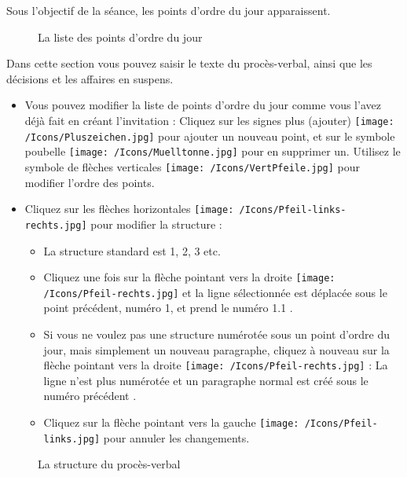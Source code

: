 Sous l'objectif de la séance, les points d'ordre du jour apparaissent.

\begin{figure}[H]
\caption{La liste des points d'ordre du jour}
\end{figure}

Dans cette section vous pouvez saisir le texte du procès-verbal, ainsi que les décisions et les affaires en suspens.

\begin{itemize}
\item
Vous pouvez modifier la liste de points d'ordre du jour comme vous l'avez déjà fait en créant l'invitation : Cliquez sur les signes plus (ajouter) \texttt{[image: /Icons/Pluszeichen.jpg]}  pour ajouter un nouveau point, et sur le symbole poubelle \texttt{[image: /Icons/Muelltonne.jpg]}  pour en supprimer un. Utilisez le symbole de flèches verticales \texttt{[image: /Icons/VertPfeile.jpg]}  pour modifier l'ordre des points.
\item
Cliquez sur les flèches horizontales \texttt{[image: /Icons/Pfeil-links-rechts.jpg]}  pour modifier la structure :

	\begin{itemize}
		\item
		La structure standard est 1, 2, 3 etc. 
		\item
		Cliquez une fois sur la flèche pointant vers la droite \texttt{[image: /Icons/Pfeil-rechts.jpg]}  et la ligne sélectionnée est déplacée sous le point précédent, numéro 1, et prend le numéro 1.1 .
		\item
		Si vous ne voulez pas une structure numérotée sous un point d'ordre du jour, mais simplement un nouveau paragraphe, cliquez à nouveau sur la flèche pointant vers la droite \texttt{[image: /Icons/Pfeil-rechts.jpg]}  : La ligne n'est plus numérotée et un paragraphe normal est créé sous le numéro précédent .
		\item
		Cliquez sur la flèche pointant vers la gauche \texttt{[image: /Icons/Pfeil-links.jpg]}  pour annuler les changements.
	\end{itemize}
\end{itemize}

\begin{figure}[H]
\caption{La structure du procès-verbal}
\end{figure}

